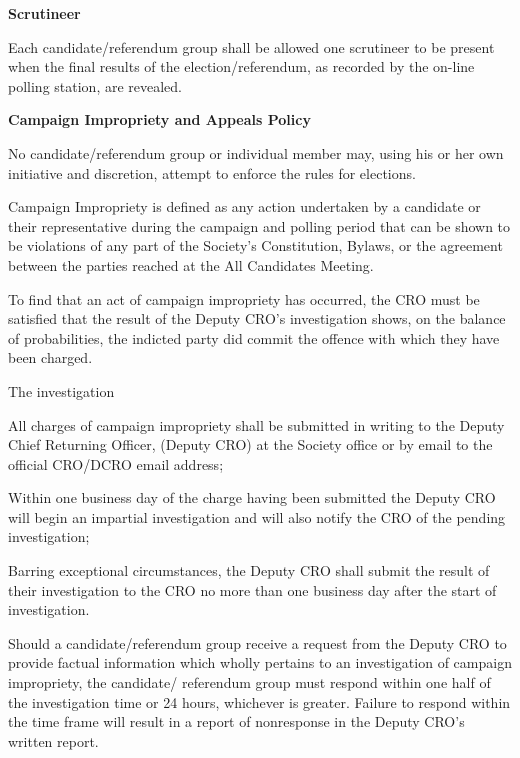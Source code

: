 \begin{longenum}[ label*=\thesection.\arabic*., align=left]
 \item \textbf{Scrutineer}
 \begin{longenum}[label*=\arabic*., align=left]
\item Each candidate/referendum group shall be allowed one scrutineer to be present when the final results of the election/referendum, as recorded by the on-line polling station, are revealed.
 \end{longenum}
 \item 	\textbf{Campaign Impropriety and Appeals Policy}	
 \begin{longenum}[label*=\arabic*., align=left]
\item No candidate/referendum group or individual member may, using his or her own initiative and 
discretion, attempt to enforce the rules for elections.
\item Campaign Impropriety is defined as any action undertaken by a candidate or their representative 
during the campaign and polling period that can be shown to be violations of any part of the Society's 
Constitution, Bylaws, or the agreement between the parties reached at the All Candidates Meeting.
\item To find that an act of campaign impropriety has occurred, the CRO must be satisfied that the result of 
the Deputy CRO's investigation shows, on the balance of probabilities, the indicted party did commit the 
offence with which they have been charged.
\item The investigation
\begin{longenum}[label*=\arabic*., align=left]
\item All charges of campaign impropriety shall be submitted in writing to the Deputy Chief Returning Officer, (Deputy CRO) at the Society office or by email to the official CRO/DCRO email address;
\item Within one business day of the charge having been submitted the Deputy CRO will begin an impartial investigation and will also notify the CRO of the pending investigation; 
\item Barring exceptional circumstances, the Deputy CRO shall submit the result of their investigation to the CRO no more than one business day after the start of investigation.
\end{longenum}
\item Should a candidate/referendum group receive a request from the Deputy CRO to provide factual information which wholly pertains to an investigation of campaign impropriety, the candidate/ referendum group must respond within one half of the investigation time or 24 hours, whichever is greater. Failure to respond within the time frame will result in a report of nonresponse in the Deputy CRO's written report.

\end{longenum}
\end{longenum}
